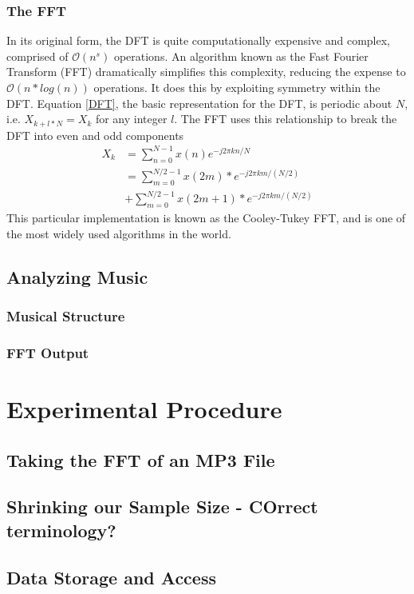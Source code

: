 \documentclass[conference]{IEEEtran}
\begin{document}
\subsubsection{The FFT}
In its original form, the DFT is quite computationally expensive and complex, comprised of $\mathcal{O}(n^{s})$ operations. An algorithm known as the Fast Fourier Transform (FFT) dramatically simplifies this complexity, reducing the expense to $\mathcal{O}(n*log(n))$ operations. It does this by exploiting symmetry within the DFT. Equation \eqref{DFT}, the basic representation for the DFT, is periodic about $N$, i.e. $X_{k+l*N}=X_{k}$ for any integer $l$. The FFT uses this relationship to break the DFT into even and odd components
\begin{equation}\label{FFT}
  \begin{split}
 X_{k} & =\sum_{n=0}^{N-1}{x(n)e^{-j2\pi kn/N}}\\
  & =\sum_{m=0}^{N/2-1}{x(2m)*e^{-j2\pi km/(N/2)}}\\ & + \sum_{m=0}^{N/2-1}{x(2m+1)*e^{-j2\pi km/(N/2)}}
  \end{split}
\end{equation}
This particular implementation is known as the Cooley-Tukey FFT, and is one of the most widely used algorithms in the world. 
\subsection{Analyzing Music}
\subsubsection{Musical Structure}
\subsubsection{FFT Output}
\section{Experimental Procedure}
\subsection{Taking the FFT of an MP3 File}
\subsection{Shrinking our Sample Size - COrrect terminology?}
\subsection{Data Storage and Access}
\end{document}
